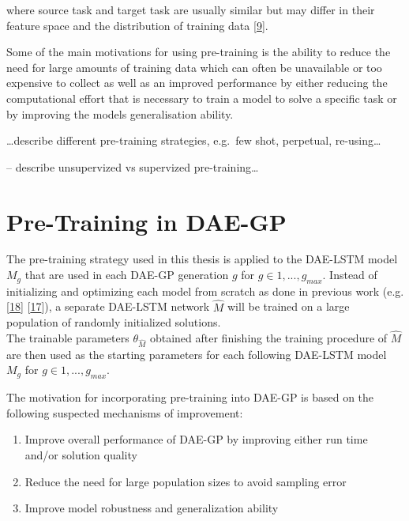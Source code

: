 \documentclass[
  11pt,
]{article}
\providecommand{\tightlist}{%
  \setlength{\itemsep}{0pt}\setlength{\parskip}{0pt}}
\begin{document}
where source task and target task are usually similar but may differ in their feature space and the distribution of training data {[}\protect\hyperlink{ref-survey_transfer_learning}{9}{]}.

Some of the main motivations for using pre-training is the ability to reduce the need for large amounts of training data which can often be unavailable or too expensive to collect as well as an improved performance by either reducing the computational effort that is necessary to train a model to solve a specific task or by improving the models generalisation ability.

\ldots describe different pre-training strategies, e.g.~few shot, perpetual, re-using\ldots{}

-- describe unsupervized vs supervized pre-training\ldots{}

\hypertarget{pre-training-in-dae-gp}{%
\section{Pre-Training in DAE-GP}\label{pre-training-in-dae-gp}}

The pre-training strategy used in this thesis is applied to the DAE-LSTM model \(M_g\) that are used in each DAE-GP generation \(g\) for \(g\in{1,...,g_{max}}\).
Instead of initializing and optimizing each model from scratch as done in previous work (e.g. {[}\protect\hyperlink{ref-dae-gp_2020_rtree}{18}{]} {[}\protect\hyperlink{ref-dae-gp_2022_symreg}{17}{]}), a separate DAE-LSTM network \(\hat{M}\) will be trained on a large population of randomly initialized solutions.\\
The trainable parameters \(\theta_{\hat{M}}\) obtained after finishing the training procedure of \(\hat{M}\) are then used as the starting parameters for each following DAE-LSTM model \(M_g\) for \(g\in{1,...,g_{max}}\).

The motivation for incorporating pre-training into DAE-GP is based on the following suspected mechanisms of improvement:

\begin{enumerate}
\def\labelenumi{\arabic{enumi}.}
\tightlist
\item
  Improve overall performance of DAE-GP by improving either run time and/or solution quality
\item
  Reduce the need for large population sizes to avoid sampling error
\item
  Improve model robustness and generalization ability
\end{enumerate}
\end{document}
